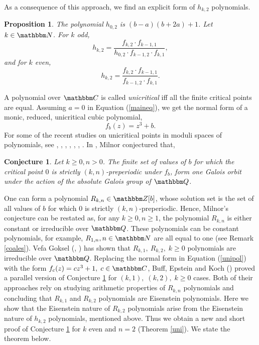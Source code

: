 \documentclass[reqno]{amsart}
\renewcommand{\eqref}[1]{(\ref{#1})}
\numberwithin{equation}{section}
\theoremstyle{plain}
\newtheorem{proposition}[theorem]{Proposition}
\newtheorem{conjecture}[theorem]{Conjecture}
\theoremstyle{definition}
\theoremstyle{definition}
\newcommand{\Q}{{\mathbbm Q}}
\newcommand{\Z}{{\mathbbm Z}}
\newcommand{\C}{{\mathbbm C}}
\newcommand{\N}{{\mathbbm N}}
\begin{document}
    As a consequence of this approach, we find an explicit form of $h_{k,2}$ polynomials. 
    \begin{proposition}
        The polynomial $h_{0,2}$ is $(b-a)(b+2a)+1$. Let $k\in \N$. For $k$ odd,
    \begin{equation}
        h_{k,2} = \dfrac{f_{k,2}\cdot f_{k-1,1}}{h_{0,2}\cdot f_{k-1,2}\cdot f_{k,1}},
    \end{equation}
    and for $k$ even,
    \begin{equation}
        h_{k,2} = \dfrac{f_{k,2}\cdot f_{k-1,1}}{f_{k-1,2}\cdot f_{k,1}}.
    \end{equation}
    \end{proposition}

    A polynomial over $\C$ is called \emph{unicritical} iff all the finite critical points are equal. Assuming $a=0$ in Equation \eqref{maineq}, we get the normal form of a monic, reduced, unicritical cubic polynomial,
    \begin{equation}\label{unipol}
        f_{b}(z)= z^{3} +b.
    \end{equation}
    For some of the recent studies on unicritical points in moduli spaces of polynomials, see \cite{Milnor+2014+15+24}, \cite{HT15}, \cite{article1}, \cite{G20}, \cite{Gok20}, \cite{BGok22}, \cite{BG23}. In \cite{Milnor+2014+15+24}, Milnor conjectured that,
    \begin{conjecture}\label{conj2}
        Let $k\geq 0, n>0$. The finite set of values of $b$ for which the critical point $0$ is strictly $(k,n)$-preperiodic under $f_{b}$, form one Galois orbit under the action of the absolute Galois group of $\Q$.
    \end{conjecture}
    One can form a polynomial $R_{k,n} \in \Z[b]$, whose solution set is the set of all values of $b$ for which $0$ is strictly $(k,n)$-preperiodic. Hence, Milnor's conjecture can be restated as, for any $k\geq 0, n\geq 1$, the polynomial $R_{k,n}$ is either constant or irreducible over $\Q$. These polynomials can be constant polynomials, for example, $R_{1,n}, n\in \N$ are all equal to one (see Remark \ref{coales}). Vefa Goksel (\cite{G20}, \cite{Gok20}) has shown that $R_{k,1},\: R_{k,2},\; k\geq 0$ polynomials are irreducible over $\Q$. Replacing the normal form in Equation \eqref{unipol} with the form $f_{c}(z)= cz^{3}+1,\; c\in \C$, Buff, Epstein and Koch (\cite{article1}) proved a parallel version of Conjecture \ref{conj2} for $(k,1),\; (k,2),\; k\geq 0$ cases. Both of their approaches rely on studying arithmetic properties of $R_{k,n}$ polynomials and concluding that $R_{k,1}$ and $R_{k,2}$ polynomials are Eisenstein polynomials. Here we show that the Eisenstein nature of $R_{k,2}$ polynomials arise from the Eisenstein nature of $h_{k,2}$ polynomials, mentioned above. Thus we obtain a new and short proof of Conjecture \ref{conj2} for $k$ even and $n=2$ (Theorem \ref{uni}). We state the theorem below.
\end{document}
